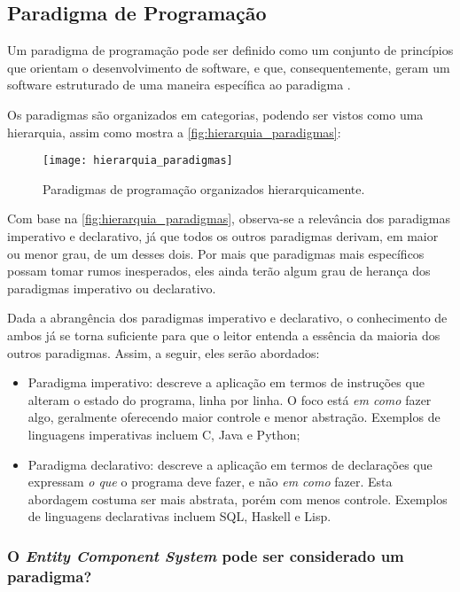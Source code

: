 \subsection{Paradigma de Programação}

Um paradigma de programação pode ser definido como um conjunto de princípios que orientam o desenvolvimento de software, e que, consequentemente, geram um software estruturado de uma maneira específica ao paradigma \cite{programmingparadigmsionos}.

Os paradigmas são organizados em categorias, podendo ser vistos como uma hierarquia, assim como mostra a \autoref{fig:hierarquia_paradigmas}:

\begin{figure}[H]
	\centering
	\texttt{[image: hierarquia\_paradigmas]}
	\caption{Paradigmas de programação organizados hierarquicamente.}
	\label{fig:hierarquia_paradigmas}
\end{figure}

Com base na \autoref{fig:hierarquia_paradigmas}, observa-se a relevância dos paradigmas imperativo e declarativo, já que todos os outros paradigmas derivam, em maior ou menor grau, de um desses dois. Por mais que paradigmas mais específicos possam tomar rumos inesperados, eles ainda terão algum grau de herança dos paradigmas imperativo ou declarativo.

Dada a abrangência dos paradigmas imperativo e declarativo, o conhecimento de ambos já se torna suficiente para que o leitor entenda a essência da maioria dos outros paradigmas. Assim, a seguir, eles serão abordados:

\begin{itemize}
	\item Paradigma imperativo: descreve a aplicação em termos de instruções que alteram o estado do programa, linha por linha. O foco está \textit{em como} fazer algo, geralmente oferecendo maior controle e menor abstração. Exemplos de linguagens imperativas incluem C, Java e Python;
	\item Paradigma declarativo: descreve a aplicação em termos de declarações que expressam \textit{o que} o programa deve fazer, e não \textit{em como} fazer. Esta abordagem costuma ser mais abstrata, porém com menos controle. Exemplos de linguagens declarativas incluem SQL, Haskell e Lisp.
\end{itemize}

\subsubsection{O \textit{Entity Component System} pode ser considerado um paradigma?}

